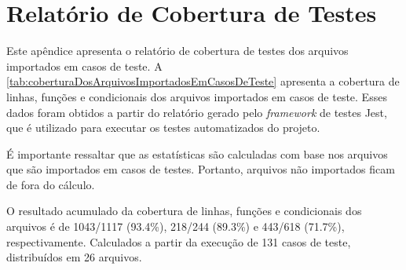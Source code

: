
\chapter{Relatório de Cobertura de Testes}
\label{cap:apendicea}

Este apêndice apresenta o relatório de cobertura de testes dos arquivos importados em casos de teste. A \autoref{tab:coberturaDosArquivosImportadosEmCasosDeTeste} apresenta a cobertura de linhas, funções e condicionais dos arquivos importados em casos de teste. Esses dados foram obtidos a partir do relatório gerado pelo \textit{framework} de testes Jest, que é utilizado para executar os testes automatizados do projeto.

É importante ressaltar que as estatísticas são calculadas com base nos arquivos que são importados em casos de testes. Portanto, arquivos não importados ficam de fora do cálculo.

O resultado acumulado da cobertura de linhas, funções e condicionais dos arquivos é de 1043/1117 (93.4\%), 218/244 (89.3\%) e 443/618 (71.7\%), respectivamente. Calculados a partir da execução de 131 casos de teste, distribuídos em 26 arquivos.

